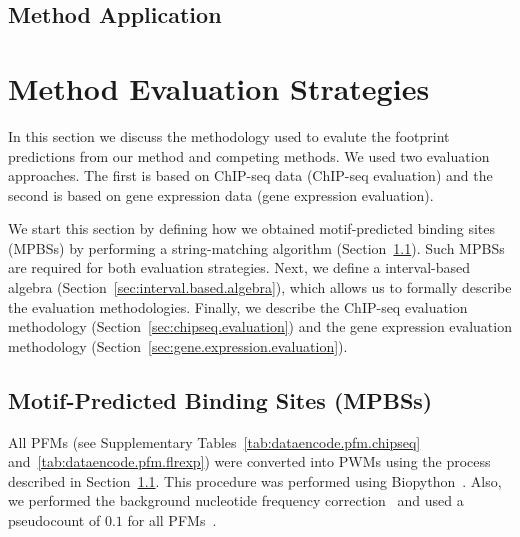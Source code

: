 
\subsection{Method Application}
\label{sec:method.application}


\section{Method Evaluation Strategies}
\label{sec:method.evaluation.strategies}

In this section we discuss the methodology used to evalute the footprint predictions from our method and competing methods. We used two evaluation approaches. The first is based on ChIP-seq data (ChIP-seq evaluation) and the second is based on gene expression data (gene expression evaluation).

We start this section by defining how we obtained motif-predicted binding sites (MPBSs) by performing a string-matching algorithm (Section~\ref{sec:mpbs}). Such MPBSs are required for both evaluation strategies. Next, we define a interval-based algebra (Section~\ref{sec:interval.based.algebra}), which allows us to formally describe the evaluation methodologies. Finally, we describe the ChIP-seq evaluation methodology (Section~\ref{sec:chipseq.evaluation}) and the gene expression evaluation methodology (Section~\ref{sec:gene.expression.evaluation}).

\subsection{Motif-Predicted Binding Sites (MPBSs)}
\label{sec:mpbs}

All PFMs (see Supplementary Tables~\ref{tab:dataencode.pfm.chipseq} and~\ref{tab:dataencode.pfm.flrexp}) were converted into PWMs using the process described in Section~\ref{sec:mpbs}. This procedure was performed using Biopython~\cite{cock2009}. Also, we performed the background nucleotide frequency correction~\cite{stormo2000} and used a pseudocount of $0.1$ for all PFMs~\cite{boyle2011}.

